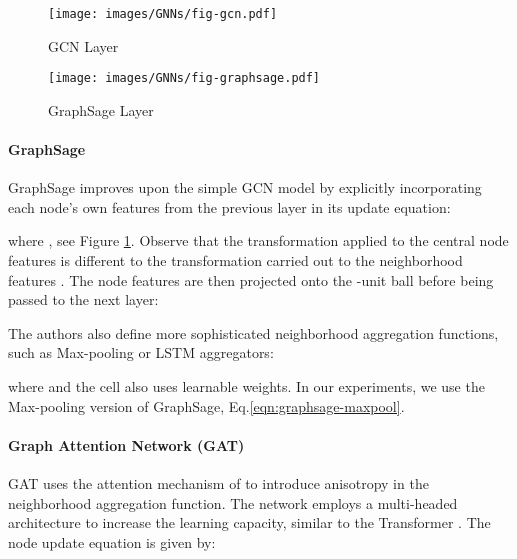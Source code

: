 \documentclass{article}
\begin{document}
\begin{figure}[t!]
\centering
\begin{minipage}{.5\textwidth}
\centering
  \vspace{2.4mm}
  \texttt{[image: images/GNNs/fig-gcn.pdf]}
  \vspace{2.4mm}
  \caption{GCN Layer}
  \label{fig:gcn}
\end{minipage}\begin{minipage}{.5\textwidth}
\centering
  \texttt{[image: images/GNNs/fig-graphsage.pdf]}
  \caption{GraphSage Layer}
  \label{fig:graphsage}
\end{minipage}\end{figure}


\paragraph{GraphSage \cite{hamilton2017inductive}}

GraphSage improves upon the simple GCN model by explicitly incorporating each node's own features from the previous layer in its update equation:

where ,
see Figure \ref{fig:graphsage}. Observe that the transformation applied to the central node features  is different to the transformation carried out to the neighborhood features . The node features are then projected onto the -unit ball before being passed to the next layer:

The authors also define more sophisticated neighborhood aggregation functions, such as Max-pooling or LSTM aggregators:

where  and the  cell also uses learnable weights. In our experiments, we use the Max-pooling version of GraphSage, Eq.\eqref{eqn:graphsage-maxpool}.









    

\paragraph{Graph Attention Network (GAT) \cite{velickovic2018graph}}
GAT uses the attention mechanism of \cite{bahdanau2014neural} to introduce anisotropy in the neighborhood aggregation function. The network employs a multi-headed architecture to increase the learning capacity, similar to the Transformer \cite{vaswani2017attention}. The node update equation is given by:
\end{document}
